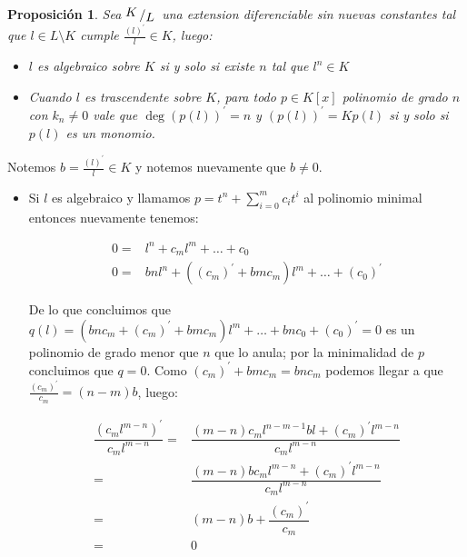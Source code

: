 \documentclass[11pt]{article}
\newcommand{\quotient}[2]{{\raisebox{.2em}{$#1$}\left/\raisebox{-.2em}{$#2$}\right.}}
\newcommand{\derivation}[1]{\left(#1\right)^\prime}
\numberwithin{theorem}{subsection}
\newtheorem{proposition}[theorem]{Proposici\'on}
\newenvironment{proof}[1][Demostraci\'on]{\begin{trivlist}
		\item[\hskip \labelsep {\bfseries #1}]}{\end{trivlist}}
\begin{document}
\begin{proposition}
	Sea $\quotient{K}{L}$ una extension diferenciable sin nuevas constantes tal que $l \in L \setminus K$ cumple $\frac{\derivation{l}}{l} \in K$, luego:
	
	\begin{itemize}
		\item $l$ es algebraico sobre $K$ si y solo si existe $n$ tal que $l^n \in K$
		\item Cuando $l$ es trascendente sobre $K$, para todo $p \in K[x]$ polinomio de grado $n$ con $k_n \neq 0$ vale que $\deg \derivation{p(l)} =n$ y $\derivation{p(l)} = K p(l)$ si y solo si  $p(l)$ es un monomio.
	\end{itemize}
\end{proposition}

\begin{proof}
	Notemos $b = \frac{\derivation{l}}{l} \in K$ y notemos nuevamente que $b \neq 0$.
	
	\begin{itemize}
		\item Si $l$ es algebraico y llamamos $p = t^n + \sum\limits_{i=0}^{m} c_it^i$ al polinomio minimal entonces nuevamente tenemos:
		
		\begin{equation}
			\begin{aligned}
			 0 = & l^n + c_ml^m + \dots + c_0 \\
			 0 = &  bnl^{n} + \left(\derivation{c_m} + bmc_m\right)l^m + \dots + \derivation{c_0}
			\end{aligned}
		\end{equation}
		
		De lo que concluimos que $q(l) = (bnc_m + \derivation{c_m} + bmc_m) l^m + \dots + bnc_0 + \derivation{c_0} = 0$ es un polinomio de grado menor que $n$ que lo anula; por la minimalidad de $p$ concluimos que $q = 0$. Como $\derivation{c_m} + bmc_m = bn c_m$ podemos llegar a que $\frac{\derivation{c_m}}{c_m} = (n-m)b$, luego:
		
		\begin{equation}
		\begin{aligned}
			\dfrac{\derivation{c_m l^{m-n}}}{c_m l^{m-n}} = & \dfrac{(m-n)c_m l^{n-m-1}bl + \derivation{c_m}l^{m-n}}{c_m l^{m-n}} \\
			= & \dfrac{(m-n)bc_ml^{m-n} + \derivation{c_m} l^{m-n}}{c_m l^{m-n}} \\
			= & (m-n)b + \dfrac{\derivation{c_m}}{c_m} \\
			=& 0
		\end{aligned}
		\end{equation}
		

\end{itemize}
\end{proof}
\end{document}
